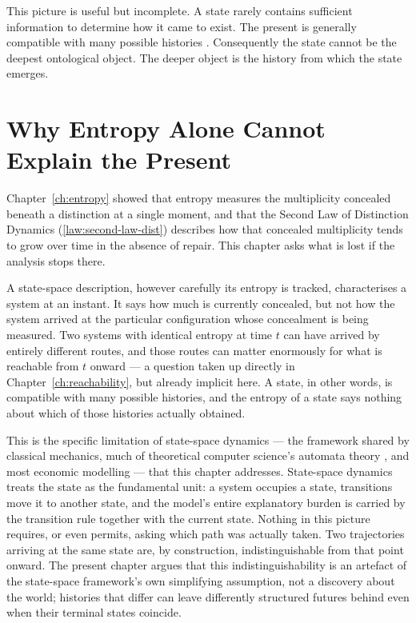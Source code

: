 \documentclass[12pt,twoside,openright]{book}
\begin{document}
This picture is useful but incomplete. A state rarely
contains sufficient information to determine how it came
to exist. The present is generally compatible with many
possible histories \parencite{whitehead1929,bergson1896}.
Consequently the state cannot be the deepest ontological
object. The deeper object is the history from which the
state emerges.

\section{Why Entropy Alone Cannot Explain the Present}
\label{sec:ch4-why-not-state}

Chapter~\ref{ch:entropy} showed that entropy measures the
multiplicity concealed beneath a distinction at a single
moment, and that the Second Law of Distinction Dynamics
(\cref{law:second-law-dist}) describes how that concealed
multiplicity tends to grow over time in the absence of
repair. This chapter asks what is lost if the analysis stops
there.

A state-space description, however carefully its entropy is
tracked, characterises a system at an instant. It says how
much is currently concealed, but not how the system arrived
at the particular configuration whose concealment is being
measured. Two systems with identical entropy at time $t$ can
have arrived by entirely different routes, and those routes
can matter enormously for what is reachable from $t$ onward
--- a question taken up directly in
Chapter~\ref{ch:reachability}, but already implicit here. A
state, in other words, is compatible with many possible
histories, and the entropy of a state says nothing about
which of those histories actually obtained.

This is the specific limitation of state-space dynamics ---
the framework shared by classical mechanics, much of
theoretical computer science's automata theory
\parencite{turing1936}, and most economic modelling --- that
this chapter addresses. State-space dynamics treats the
state as the fundamental unit: a system occupies a state,
transitions move it to another state, and the model's entire
explanatory burden is carried by the transition rule together
with the current state. Nothing in this picture requires, or
even permits, asking which path was actually taken. Two
trajectories arriving at the same state are, by construction,
indistinguishable from that point onward. The present chapter
argues that this indistinguishability is an artefact of the
state-space framework's own simplifying assumption, not a
discovery about the world; histories that differ can leave
differently structured futures behind even when their
terminal states coincide.
\end{document}
